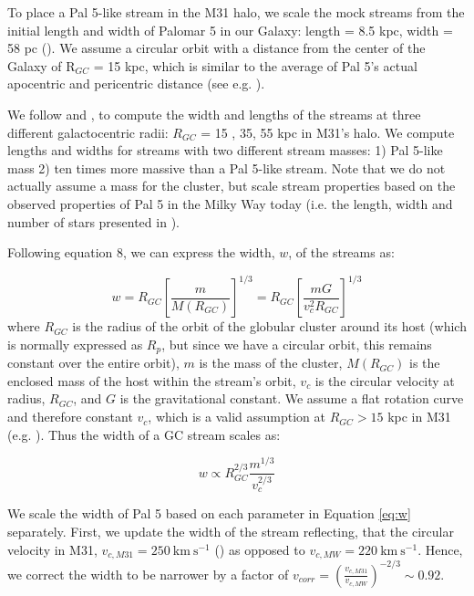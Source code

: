 \documentclass[twocolumn]{aastex62}
\newcommand{\kms}{\ensuremath{\textrm{km}~\textrm{s}^{-1}}}
\begin{document}
To place a Pal 5-like stream in the M31 halo, %
we scale the mock streams from the initial length and width of Palomar 5 in our Galaxy: length = 8.5 kpc, width = 58 pc (\citealt{ibata16}). We assume a circular orbit with a distance from the center of the Galaxy of R$_{GC}$ = 15 kpc, which is similar to the average of Pal 5's actual apocentric and pericentric distance (see e.g. \citealt{erkal17}). 

We follow \citet{johnston98} and \citet{johnston01}, to compute the width and lengths of the streams at three different galactocentric radii: $R_{GC}$ = 15 , 35, 55 kpc in M31's halo. We compute lengths and widths for streams with two different stream masses: 1) Pal 5-like mass 2) ten times more massive than a Pal 5-like stream. Note that we do not actually assume a mass for the cluster, but scale stream properties based on the observed properties of Pal 5 in the Milky Way today (i.e. the length, width and number of stars presented in \citealt{ibata16}).  

Following \citet{johnston01} equation 8, we can express the width, $w$, of the streams as:

\begin{equation}
w = R_{GC} \left[\frac{m}{M(R_{GC})}\right]^{1/3} = R_{GC} \left[\frac{m G}{v_c^2 R_{GC}}\right]^{1/3} 
\end{equation}
where $R_{GC}$ is the radius of the orbit of the globular cluster around its host (which is normally expressed as $R_p$, but since we have a circular orbit, this remains constant over the entire orbit), $m$ is the mass of the cluster, $M(R_{GC})$ is the enclosed mass of the host within the stream's orbit, $v_c$ is the circular velocity at radius, $R_{GC}$, and $G$ is the gravitational constant. We assume a flat rotation curve and therefore constant  $v_c$, which is a valid assumption at $R_{GC} > 15$ kpc in M31 (e.g. \citealt{chemin09}). Thus the width of a GC stream scales as:

\begin{equation}
\label{eq:w}
w \propto R_{GC}^{2/3} \frac{m^{1/3}}{v_c^{2/3}}
\end{equation}

We scale the width of Pal 5 based on each parameter in Equation \ref{eq:w} separately. First, we update the width of the stream reflecting, that the circular velocity in M31, $v_{c, M31}= 250 ~\kms$  (\citealt{chemin09}) as opposed to  $v_{c, MW}= 220 ~\kms$. Hence, we correct the width to be narrower by a factor of $v_{corr} =  \left(\frac{v_{c,M31}}{v_{c,MW}}\right)^{-2/3} \sim 0.92$. 
\end{document}
